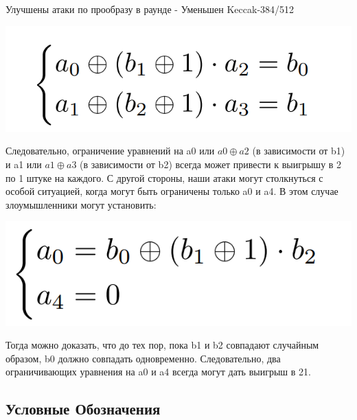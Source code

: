\documentclass[utf8,14pt,a4paper,oneside,russian]{book}
\begin{document}
Улучшены атаки по прообразу в раунде - Уменьшен Keccak-384/512

\begin{center}
    \includegraphics*[scale=0.5]{7}\\
\end{center}

Следовательно, ограничение уравнений на a0 или $a0 \oplus a2$ (в зависимости от b1) и a1
или $a1 \oplus a3$ (в зависимости от b2) всегда может привести к выигрышу в 2
по 1 штуке на каждого.
С другой стороны, наши атаки могут столкнуться с особой ситуацией,
когда могут быть ограничены только a0 и a4. В этом случае злоумышленники могут установить:

\begin{center}
    \includegraphics*[scale=0.5]{8}\\
\end{center}

Тогда можно доказать, что до тех пор, пока b1 и b2 совпадают случайным образом, b0
должно совпадать одновременно. Следовательно, два ограничивающих уравнения на a0 и
a4 всегда могут дать выигрыш в 21.

\newpage
\subsection{Условные Обозначения}
\end{document}
